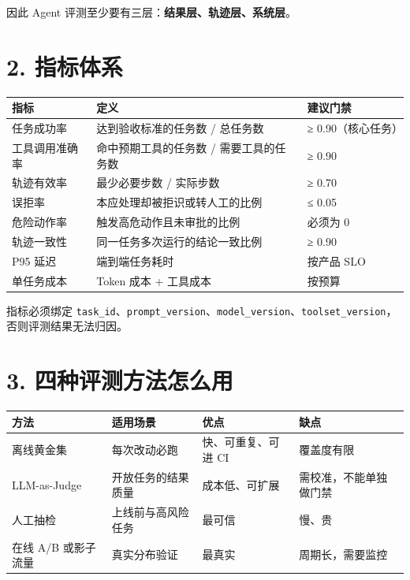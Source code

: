 \documentclass[9pt,a4paper,twocolumn]{ctexart}
\begin{document}
因此 Agent 评测至少要有三层：\textbf{结果层、轨迹层、系统层}。



\section*{2. 指标体系}

{\footnotesize
\begin{tabular}{|p{}|p{}|p{}|}
\hline
\textbf{指标} & \textbf{定义} & \textbf{建议门禁} \\
\hline
任务成功率 & 达到验收标准的任务数 / 总任务数 & ≥ 0.90（核心任务） \\
\hline
工具调用准确率 & 命中预期工具的任务数 / 需要工具的任务数 & ≥ 0.90 \\
\hline
轨迹有效率 & 最少必要步数 / 实际步数 & ≥ 0.70 \\
\hline
误拒率 & 本应处理却被拒识或转人工的比例 & ≤ 0.05 \\
\hline
危险动作率 & 触发高危动作且未审批的比例 & 必须为 0 \\
\hline
轨迹一致性 & 同一任务多次运行的结论一致比例 & ≥ 0.90 \\
\hline
P95 延迟 & 端到端任务耗时 & 按产品 SLO \\
\hline
单任务成本 & Token 成本 + 工具成本 & 按预算 \\
\hline
\end{tabular}
}



指标必须绑定 \texttt{task\_id}、\texttt{prompt\_version}、\texttt{model\_version}、\texttt{toolset\_version}，否则评测结果无法归因。



\section*{3. 四种评测方法怎么用}

{\footnotesize
\begin{tabular}{|p{}|p{}|p{}|p{}|}
\hline
\textbf{方法} & \textbf{适用场景} & \textbf{优点} & \textbf{缺点} \\
\hline
离线黄金集 & 每次改动必跑 & 快、可重复、可进 CI & 覆盖度有限 \\
\hline
LLM-as-Judge & 开放任务的结果质量 & 成本低、可扩展 & 需校准，不能单独做门禁 \\
\hline
人工抽检 & 上线前与高风险任务 & 最可信 & 慢、贵 \\
\hline
在线 A/B 或影子流量 & 真实分布验证 & 最真实 & 周期长，需要监控 \\
\hline
\end{tabular}
}
\end{document}
